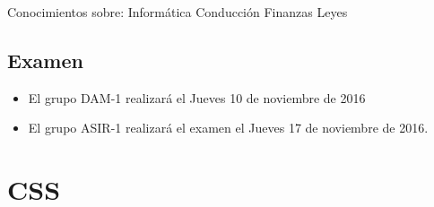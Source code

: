 \documentclass[letterpaper,10pt,spanish]{sphinxmanual}
\begin{document}
\begin{sphinxVerbatim}[commandchars=\\\{\}]
                Conocimientos sobre:
                  
                         
                                Informática
                         
                                Conducción
                         
                                Finanzas
                         
                                Leyes
\end{sphinxVerbatim}


\section{Examen}
\label{\detokenize{tema2:examen}}\begin{itemize}
\item {} 
El grupo DAM-1 realizará el Jueves 10 de noviembre de 2016

\item {} 
El grupo ASIR-1 realizará el examen el Jueves 17 de noviembre de 2016.

\end{itemize}


\chapter{CSS}
\label{\detokenize{tema3::doc}}\label{\detokenize{tema3:css}}
\end{document}
